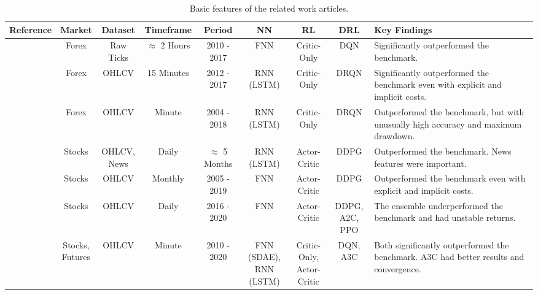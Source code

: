 \begin{table}
\centering
\footnotesize
\caption{Basic features of the related work articles.}
\label{Tables:BasicRelatedWork}
\begin{tabularx}{\linewidth}{@{}ccccccccX@{}}
\toprule
\textbf{Reference} & \textbf{Market} & \textbf{Dataset} & \textbf{Timeframe} & \textbf{Period} & \textbf{NN} & \textbf{RL} & \textbf{DRL} & \textbf{Key Findings} \\
\midrule

\cite{carapuco_reinforcement_2018} & Forex & Raw Ticks & \(\approx\) 2 Hours & 2010 - 2017 & FNN & Critic-Only & DQN & Significantly outperformed the benchmark. \\

\cite{huang_financial_2018} & Forex & OHLCV & 15 Minutes & 2012 - 2017 & RNN (LSTM) & Critic-Only & DRQN & Significantly outperformed the benchmark even with explicit and implicit costs. \\

\cite{rundo_deep_2019} & Forex & OHLCV & Minute & 2004 - 2018 & RNN (LSTM) & Critic-Only & DRQN & Outperformed the benchmark, but with unusually high accuracy and maximum drawdown. \\

\cite{saini_stock_2019} & Stocks & \makecell{OHLCV, \\ News} & Daily & \(\approx\) 5 Months & RNN (LSTM) & Actor-Critic & DDPG & Outperformed the benchmark. News features were important. \\

\cite{gran_deep_2019} & Stocks & OHLCV & Monthly & 2005 - 2019 & FNN & Actor-Critic & DDPG & Outperformed the benchmark even with explicit and implicit costs. \\

\cite{kong_empirical_2023} & Stocks & OHLCV & Daily & 2016 - 2020 & FNN & Actor-Critic & \makecell{DDPG, \\ A2C, PPO} & The ensemble underperformed the benchmark and had unstable returns. \\

\cite{li_deep_2019} & \makecell{Stocks, \\ Futures} & OHLCV & Minute & 2010 - 2020 & \makecell{FNN (SDAE), \\ RNN (LSTM)} & \makecell{Critic-Only, \\ Actor-Critic} & DQN, A3C & Both significantly outperformed the benchmark. A3C had better results and convergence. \\


\end{tabularx}
\end{table}
